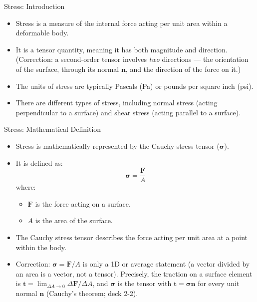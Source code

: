 \documentclass{beamer}
\begin{document}
\begin{frame}{Stress: Introduction}
    \begin{itemize}
        \item Stress is a measure of the internal force acting per unit area within a deformable body.
        \item It is a tensor quantity, meaning it has both magnitude and direction. (Correction: a second-order tensor involves \emph{two} directions --- the orientation of the surface, through its normal $\mathbf{n}$, and the direction of the force on it.)
        \item The units of stress are typically Pascals (Pa) or pounds per square inch (psi).
        \item There are different types of stress, including normal stress (acting perpendicular to a surface) and shear stress (acting parallel to a surface).
    \end{itemize}
\end{frame}

\begin{frame}{Stress: Mathematical Definition}
    \begin{itemize}
        \item Stress is mathematically represented by the Cauchy stress tensor ($\boldsymbol{\sigma}$).
        \item It is defined as:
        \begin{equation*}
            \boldsymbol{\sigma} = \frac{\mathbf{F}}{A}
        \end{equation*}
        where:
        \begin{itemize}
            \item $\mathbf{F}$ is the force acting on a surface.
            \item $A$ is the area of the surface.
        \end{itemize}
        \item The Cauchy stress tensor describes the force acting per unit area at a point within the body.
        \item Correction: $\boldsymbol{\sigma} = \mathbf{F}/A$ is only a 1D or average statement (a vector divided by an area is a vector, not a tensor). Precisely, the traction on a surface element is $\mathbf{t} = \lim_{\Delta A\to 0}\Delta\mathbf{F}/\Delta A$, and $\boldsymbol{\sigma}$ is the tensor with $\mathbf{t} = \boldsymbol{\sigma}\mathbf{n}$ for every unit normal $\mathbf{n}$ (Cauchy's theorem; deck 2-2).
    \end{itemize}
\end{frame}
\end{document}
